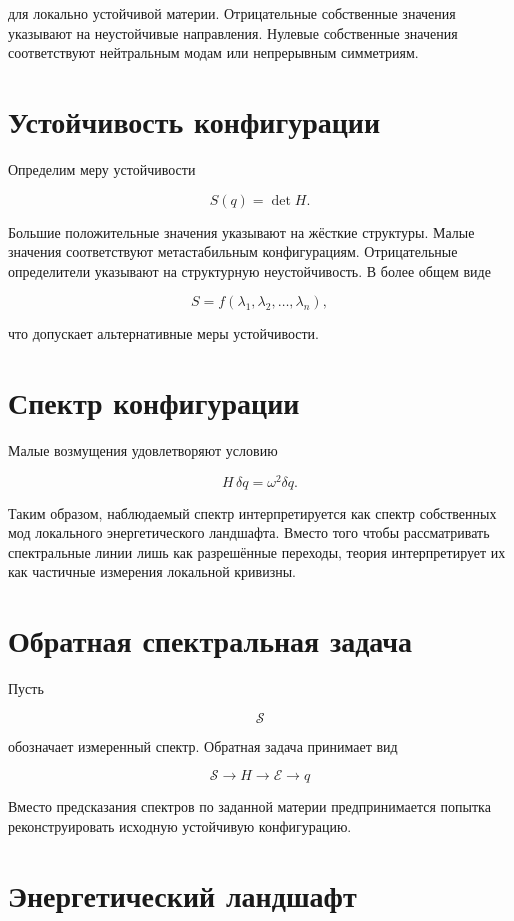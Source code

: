 для локально устойчивой материи. Отрицательные собственные значения указывают на неустойчивые направления. Нулевые собственные значения соответствуют нейтральным модам или непрерывным симметриям.

\section{Устойчивость конфигурации}

Определим меру устойчивости

\[ S(q) = \det H. \]

Большие положительные значения указывают на жёсткие структуры. Малые значения соответствуют метастабильным конфигурациям. Отрицательные определители указывают на структурную неустойчивость. В более общем виде

\[ S = f(\lambda_1,\lambda_2,\ldots,\lambda_n), \]

что допускает альтернативные меры устойчивости.

\section{Спектр конфигурации}

Малые возмущения удовлетворяют условию

\[ H\, \delta q = \omega^2 \delta q. \]

Таким образом, наблюдаемый спектр интерпретируется как спектр собственных мод локального энергетического ландшафта. Вместо того чтобы рассматривать спектральные линии лишь как разрешённые переходы, теория интерпретирует их как частичные измерения локальной кривизны.

\section{Обратная спектральная задача}

Пусть

\[ \mathcal S \]

обозначает измеренный спектр. Обратная задача принимает вид

\[ \boxed{ \mathcal S \rightarrow H \rightarrow \mathcal E \rightarrow q } \]

Вместо предсказания спектров по заданной материи предпринимается попытка реконструировать исходную устойчивую конфигурацию.

\section{Энергетический ландшафт}

